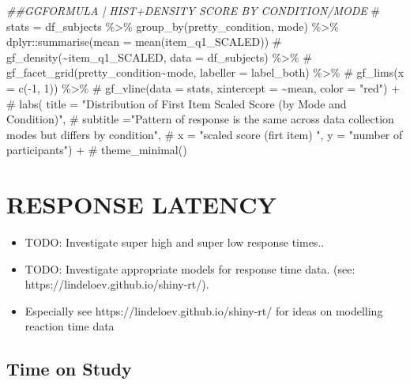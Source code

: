 \documentclass[
  letterpaper,
  DIV=11,
  numbers=noendperiod]{scrreprt}
\newenvironment{Shaded}{\begin{snugshade}}{\end{snugshade}}
\newcommand{\CommentTok}[1]{\textcolor[rgb]{0.37,0.37,0.37}{#1}}
\newcommand{\DocumentationTok}[1]{\textcolor[rgb]{0.37,0.37,0.37}{\textit{#1}}}
\begin{document}
\begin{Shaded}
\begin{Highlighting}[]
\DocumentationTok{\#\#GGFORMULA | HIST+DENSITY SCORE BY CONDITION/MODE}
\CommentTok{\# stats = df\_subjects \%\textgreater{}\% group\_by(pretty\_condition, mode) \%\textgreater{}\% dplyr::summarise(mean = mean(item\_q1\_SCALED))}
\CommentTok{\# gf\_density(\textasciitilde{}item\_q1\_SCALED, data = df\_subjects) \%\textgreater{}\%}
\CommentTok{\#   gf\_facet\_grid(pretty\_condition\textasciitilde{}mode, labeller = label\_both) \%\textgreater{}\%}
\CommentTok{\#   gf\_lims(x = c({-}1, 1)) \%\textgreater{}\%}
\CommentTok{\#   gf\_vline(data = stats, xintercept = \textasciitilde{}mean, color = "red") +}
\CommentTok{\# labs( title = "Distribution of First Item Scaled Score (by Mode and Condition)",}
\CommentTok{\#         subtitle ="Pattern of response is the same across data collection modes but differs by condition",}
\CommentTok{\#         x = "scaled score (firt item) ", y = "number of participants") + }
\CommentTok{\#   theme\_minimal()}
\end{Highlighting}
\end{Shaded}

\hypertarget{response-latency}{%
\section{RESPONSE LATENCY}\label{response-latency}}

\begin{itemize}
\item
  {TODO: Investigate super high and super low response times.}.
\item
  {TODO: Investigate appropriate models for response time data. (see:
  https://lindeloev.github.io/shiny-rt/)}.
\item
  Especially see https://lindeloev.github.io/shiny-rt/ for ideas on
  modelling reaction time data
\end{itemize}

\hypertarget{time-on-study}{%
\subsection{Time on Study}\label{time-on-study}}
\end{document}
